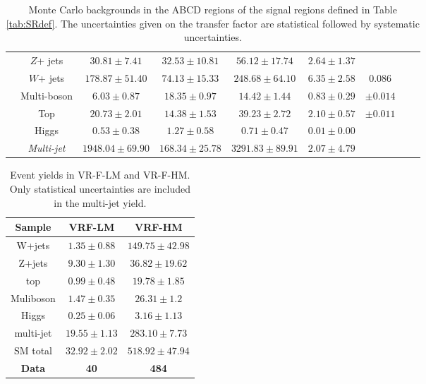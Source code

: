 \begin{table}
\begin{tabular}{|c|c|c|c|c|c|c|c|c|}
\cline{2-6} \cline{3-6} \cline{4-6} \cline{5-6} \cline{6-6} 
 & {\tiny{}$Z$+ jets } & {\tiny{}$30.81\pm7.41$ } & {\tiny{}$32.53\pm10.81$ } & {\tiny{}$56.12\pm17.74$ } & {\tiny{}$2.64\pm1.37$ } &  &  & \tabularnewline
\cline{2-6} \cline{3-6} \cline{4-6} \cline{5-6} \cline{6-6} 
 & {\tiny{}$W$+ jets } & {\tiny{}$178.87\pm51.40$ } & {\tiny{}$74.13\pm15.33$ } & {\tiny{}$248.68\pm64.10$ } & {\tiny{}$6.35\pm2.58$ } & {\tiny{}$0.086$ } &  & \tabularnewline
\cline{2-6} \cline{3-6} \cline{4-6} \cline{5-6} \cline{6-6} 
 & {\tiny{}Multi-boson } & {\tiny{}$6.03\pm0.87$ } & {\tiny{}$18.35\pm0.97$ } & {\tiny{}$14.42\pm1.44$ } & {\tiny{}$0.83\pm0.29$ } & {\tiny{}$\pm0.014$ } &  & \tabularnewline
\cline{2-6} \cline{3-6} \cline{4-6} \cline{5-6} \cline{6-6} 
 & {\tiny{}Top } & {\tiny{}$20.73\pm2.01$ } & {\tiny{}$14.38\pm1.53$ } & {\tiny{}$39.23\pm2.72$ } & {\tiny{}$2.10\pm0.57$ } & {\tiny{}$\pm0.011$ } &  & \tabularnewline
\cline{2-6} \cline{3-6} \cline{4-6} \cline{5-6} \cline{6-6} 
 & {\tiny{}Higgs } & {\tiny{}$0.53\pm0.38$ } & {\tiny{}$1.27\pm0.58$ } & {\tiny{}$0.71\pm0.47$ } & {\tiny{}$0.01\pm0.00$ } & \multirow{2}{*}{} &  & \tabularnewline
\cline{2-6} \cline{3-6} \cline{4-6} \cline{5-6} \cline{6-6} 
 & \emph{\tiny{}Multi-jet}{\tiny{} } & {\tiny{}$1948.04\pm69.90$ } & {\tiny{}$168.34\pm25.78$ } & {\tiny{}$3291.83\pm89.91$ } & {\tiny{}$2.07\pm4.79$ } &  &  & \tabularnewline
\hline 
\end{tabular}{\tiny{}\caption{Monte Carlo backgrounds in the ABCD regions of the signal regions
defined in Table \ref{tab:SRdef}. The uncertainties given on the
transfer factor are  statistical followed by systematic uncertainties.
\label{tab:bkgestimation:ABCDresults} }
}
\end{table}


\begin{table}
\centering
\begin{tabular}{|c|c|c|}
\hline
Sample & VRF-LM& VRF-HM\\
\hline
\hline
W+jets & $1.35\pm0.88$ & $149.75\pm42.98$\\
\hline
Z+jets & $9.30\pm1.30$ & $36.82\pm19.62$\\
\hline
top & $0.99\pm0.48$ & $19.78\pm1.85$\\
\hline
Muliboson & $1.47\pm0.35$ & $26.31\pm1.2$\\
\hline
Higgs & $0.25\pm0.06$ & $3.16\pm1.13$\\
\hline
multi-jet & $19.55 \pm 1.13$ & $283.10 \pm 7.73$\\
\hline
\hline
SM total & $32.92 \pm 2.02$ & $518.92 \pm 47.94$\\
\hline
\textbf{Data} & \textbf{40} & \textbf{484}\\
\hline
\end{tabular}
\caption{Event yields in VR-F-LM and VR-F-HM. Only statistical
  uncertainties are included in the multi-jet 
  yield.  \label{tab:bkgestimation:VRFresults}%
}
\end{table}


